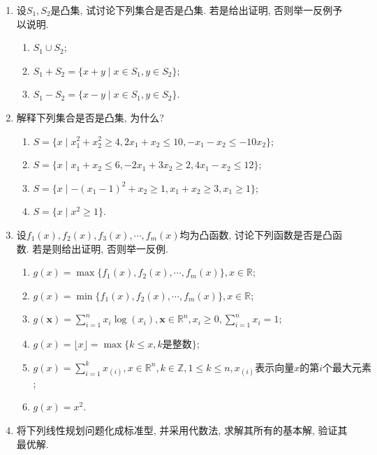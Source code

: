 \begin{enumerate}
    \item
        设$S_1,S_2$是凸集, 试讨论下列集合是否是凸集.
        若是给出证明, 否则举一反例予以说明.
        \begin{enumerate}
            \item $S_1\cup S_2$;
            \item $S_1+S_2=\{x+y \mid x\in S_1, y\in S_2\}$;
            \item $S_1-S_2=\{x-y \mid x\in S_1, y\in S_2\}$.
        \end{enumerate}

    \item
        解释下列集合是否是凸集, 为什么?
        \begin{enumerate}
            \item $S=\{x \mid x_1^2+x_2^2\geq4, 2x_1+x_2\leq10, -x_1-x_2\leq-10x_2\}$;
            \item $S=\{x \mid x_1+x_2\leq6, -2x_1+3x_2\geq2, 4x_1-x_2\leq12\}$;
            \item $S=\{x \mid -(x_1-1)^2+x_2\geq1, x_1+x_2\geq3, x_1\geq1\}$;
            \item $S=\{x \mid x^2\geq1\}$.
        \end{enumerate}
    
    \item 
        设$f_1(x),f_2(x),f_3(x),\cdots,f_m(x)$均为凸函数, 讨论下列函数是否是凸函数.
        若是则给出证明, 否则举一反例.
        \begin{enumerate}
            \item $g(x)=\max\{f_1(x),f_2(x),\cdots,f_m(x)\}, x\in\mathbb{R}$;
            \item $g(x)=\min\{f_1(x),f_2(x),\cdots,f_m(x)\}, x\in\mathbb{R}$;
            \item $g(\bm{x})=\sum_{i=1}^nx_i\log(x_i), \bm{x}\in\mathbb{R}^n, x_i\geq0, \sum_{i=1}^nx_i=1$;
            \item $g(x)=\lfloor x \rfloor=\max\{k\leq x, k\text{是整数}\}$;
            \item $g(x)=\sum_{i=1}^k x_{(i)}, x\in\mathbb{R}^n, k\in\mathbb{Z}, 1\leq k\leq n, x_{(i)}\text{表示向量}x\text{的第}i\text{个最大元素}$;
            \item $g(x)=x^2$.
        \end{enumerate}
    
    \item 将下列线性规划问题化成标准型, 并采用代数法, 求解其所有的基本解, 验证其最优解.
\end{enumerate}
